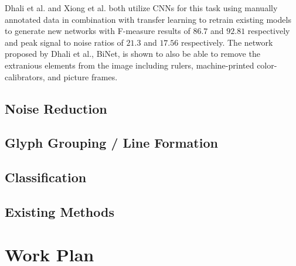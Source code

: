 \documentclass[12pt,a4paper,final]{article}
\begin{document}
Dhali et al.\cite{Dhali2019} and Xiong et al.\cite{Xiong} both utilize CNNs for this task using manually annotated data in combination with transfer learning to retrain existing models to generate new networks with F-measure results of $86.7$ and $92.81$ respectively and peak signal to noise ratios of $21.3$ and $17.56$ respectively. The network proposed by Dhali et al., BiNet, is shown to also be able to remove the extranious elements from the image including rulers, machine-printed color-calibrators, and picture frames.

\subsection{Noise Reduction}

\subsection{Glyph Grouping / Line Formation}
\todo{}

\subsection{Classification}
\todo{}

\subsection{Existing Methods}
\todo{}

\newpage
\section{Work Plan}
\todo{}

\printbibliography[heading=bibintoc, title={References}]
\end{document}
